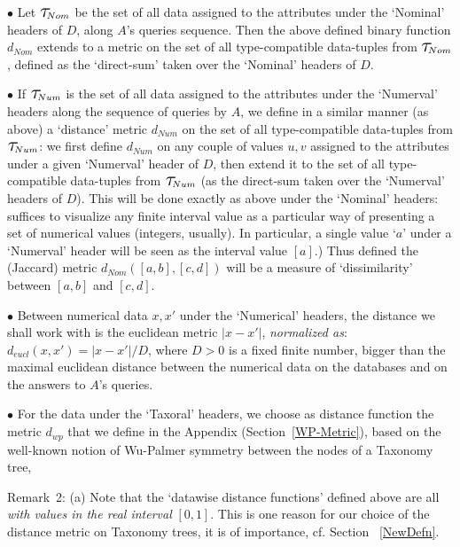 \documentclass[pdflatex]{article}
\newcommand\Tau{\scalerel*{\tau}{T}\!\!}
\begin{document}
 $\bullet$ Let  $\Tau_{Nom}$  be the  set of all data assigned to the attributes under
 the  `Nominal' headers of $D$, along  $A$'s queries sequence. Then the
 above  defined binary  function $d_{Nom}$ extends to a metric on the set   of all
  type-compatible data-tuples from $\Tau_{Nom}$, defined as the `direct-sum' 
  taken over the `Nominal' headers of $D$. 
    
  $\bullet$ If $\Tau_{Num}$  is the set of all data assigned to the attributes under  the
  `Numerval'   headers along the sequence  of queries by $A$, we  define in a similar
  manner (as above)  a `distance'  metric  $d_{Num}$ on the set of all  type-compatible
  data-tuples  from $\Tau_{Num}$:  we first define $d_{Num}$ on any couple  of values
  $u, v$  assigned to  the attributes under a given `Numerval' header of $D$, then
  extend it  to the set of all type-compatible data-tuples from $\Tau_{Num}$ (as the
  direct-sum  taken  over the  `Numerval'   headers of $D$).  This will be done exactly
  as  above under  the `Nominal' headers: suffices to visualize any finite interval value
  as a  particular   way of presenting a set of numerical values (integers, usually).
  In particular, a   single value `$a$'    under a `Numerval'  header will be seen as
  the interval value   $[a]$.) Thus defined the (Jaccard) metric $d_{Nom}([a, b], [c, d])$
  will be a   measure of `dissimilarity'  between $[a, b]$  and $[c, d]$. 

  $\bullet$ Between numerical data $x, x'$ under the `Numerical' headers, the distance
  we shall    work with is the euclidean  metric $|x - x'|$,  {\em normalized as}: 
   $d_{eucl}(x, x') = |x - x'| / D$, where  $D > 0$ is a fixed finite number,  bigger than
   the maximal euclidean  distance between the numerical data on the databases 
   and on the answers to $A$'s queries. 

   $\bullet$ For the data under the `Taxoral'  headers, we choose as distance function the 
   metric    $d_{wp}$ that we define  in the Appendix  (Section~\ref{WP-Metric}),  based on 
   the  well-known  notion of Wu-Palmer symmetry between the nodes of a Taxonomy tree,
   
   \vspace*{1mm}
    {\sc  Remark}~2: 
   (a) Note that  the `datawise  distance functions' defined above  are all {\em with values
    in   the real interval} $[0, 1]$.  This is one reason for our choice of the distance 
   metric on Taxonomy trees, it is of importance, cf. Section~ \ref{NewDefn}.
   
\end{document}
